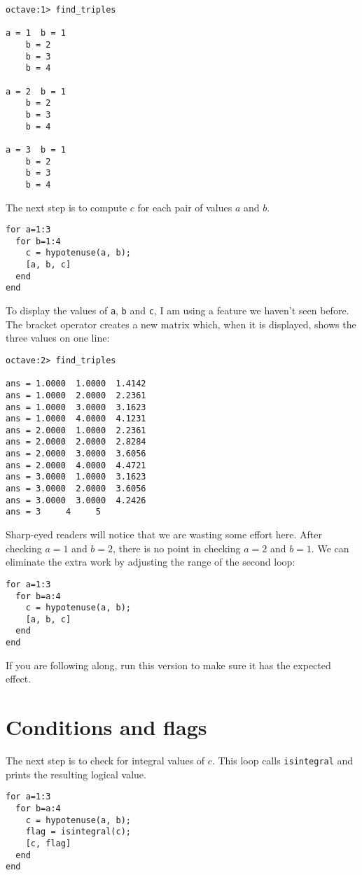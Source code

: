 \begin{verbatim}
octave:1> find_triples

a = 1  b = 1
    b = 2
    b = 3
    b = 4

a = 2  b = 1
    b = 2
    b = 3
    b = 4

a = 3  b = 1
    b = 2
    b = 3
    b = 4
\end{verbatim}

The next step is to compute $c$ for each pair of values $a$ and $b$.

\begin{verbatim}
for a=1:3
  for b=1:4
    c = hypotenuse(a, b);
    [a, b, c]
  end
end
\end{verbatim}

To display the values of {\tt a}, {\tt b} and {\tt c}, I am
using a feature we haven't seen before. The bracket operator
creates a new matrix which, when it is displayed, shows the
three values on one line:

\begin{verbatim}
octave:2> find_triples

ans = 1.0000  1.0000  1.4142
ans = 1.0000  2.0000  2.2361
ans = 1.0000  3.0000  3.1623
ans = 1.0000  4.0000  4.1231
ans = 2.0000  1.0000  2.2361
ans = 2.0000  2.0000  2.8284
ans = 2.0000  3.0000  3.6056
ans = 2.0000  4.0000  4.4721
ans = 3.0000  1.0000  3.1623
ans = 3.0000  2.0000  3.6056
ans = 3.0000  3.0000  4.2426
ans = 3     4     5
\end{verbatim}

Sharp-eyed readers will notice that we are wasting some effort here.
After checking $a=1$ and $b=2$, there is no point in checking
$a=2$ and $b=1$. We can eliminate the extra work by adjusting the
range of the second loop:

\begin{verbatim}
for a=1:3
  for b=a:4
    c = hypotenuse(a, b);
    [a, b, c]
  end
end
\end{verbatim}

If you are following along, run this version to make sure it has
the expected effect.


\section{Conditions and flags}

The next step is to check for integral values of $c$. This
loop calls {\tt isintegral} and prints the resulting logical
value.

\begin{verbatim}
for a=1:3
  for b=a:4
    c = hypotenuse(a, b);
    flag = isintegral(c);
    [c, flag]
  end
end
\end{verbatim}

